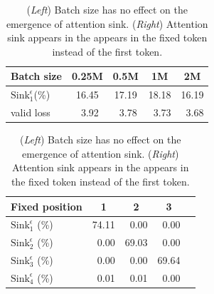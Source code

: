 \begin{table}[htbp]
\caption{(\emph{Left}) Batch size has no effect on the emergence of attention sink. (\emph{Right}) Attention sink appears in the appears in the fixed token instead of the first token.}
\begin{minipage}[t]{0.52\linewidth}
\begin{center}
\begin{tabular}[t]{l|cccc}
\toprule
Batch size & 0.25M & 0.5M & 1M & 2M \\
\midrule
$\textrm{Sink}_1^{\epsilon}$(\%) & 16.45 & 17.19 & 18.18 & 16.19 \\
valid loss & \,\,\,3.92 & \,\,\,3.78 & \,\,\,3.73 & \,\,\,3.68 \\
\bottomrule
\end{tabular}
\end{center}
\end{minipage}
\hfill
\begin{minipage}[t]{0.47\linewidth}
\begin{center}
\begin{tabular}[t]{l|cccc}
\toprule  %
Fixed position & 1 & 2 & 3 \\
\midrule
$\textrm{Sink}_1^\epsilon$ (\%) & 74.11 & \,\,\,0.00 & \,\,\,0.00 \\
$\textrm{Sink}_2^\epsilon$ (\%) & \,\,\,0.00 & 69.03 & \,\,\,0.00 \\
$\textrm{Sink}_3^\epsilon$ (\%) & \,\,\,0.00 & \,\,\,0.00 & 69.64 \\
$\textrm{Sink}_4^\epsilon$ (\%) & \,\,\,0.01 & \,\,\,0.01 & \,\,\,0.00 \\
\bottomrule
\end{tabular}
\end{center}
\end{minipage}
\label{batch_fix}
\end{table}

